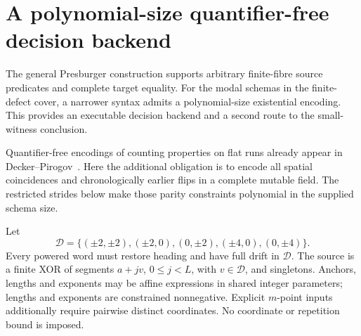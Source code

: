 \section{A polynomial-size quantifier-free decision backend}\label{sec:qf}
The general Presburger construction supports arbitrary finite-fibre source
predicates and complete target equality. For the modal schemas in the
finite-defect cover, a narrower syntax admits a polynomial-size existential
encoding. This provides an executable decision backend and a second route
to the small-witness conclusion.

Quantifier-free encodings of counting properties on flat runs already appear
in Decker--Pirogov~\cite{flat}. Here the additional obligation is to encode
all spatial coincidences and chronologically earlier flips in a complete
mutable field. The restricted strides below make those parity constraints
polynomial in the supplied schema size.

Let
\[
 \mathcal D=\{(\pm2,\pm2),(\pm2,0),(0,\pm2),(\pm4,0),(0,\pm4)\}.
\]
Every powered word must restore heading and have full drift in $\mathcal D$.
The source is a finite XOR of segments $a+jv$, $0\le j<L$, with
$v\in\mathcal D$, and singletons. Anchors, lengths and exponents may be
affine expressions in shared integer parameters; lengths and exponents
are constrained nonnegative. Explicit $m$-point inputs additionally require
pairwise distinct coordinates. No coordinate or repetition bound is imposed.

